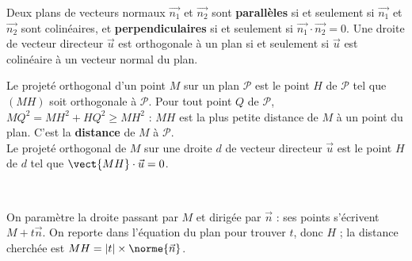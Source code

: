 \begin{propriete}
Deux plans de vecteurs normaux $\vec{n_1}$ et $\vec{n_2}$ sont \textbf{parallèles} si et seulement si $\vec{n_1}$ et $\vec{n_2}$ sont
colinéaires, et \textbf{perpendiculaires} si et seulement si $\vec{n_1}\cdot\vec{n_2}=0$. Une droite de vecteur directeur $\vec u$ est
orthogonale à un plan si et seulement si $\vec u$ est colinéaire à un vecteur normal du plan.
\end{propriete}


\noindent
\begin{minipage}[c]{0.58\linewidth}
\begin{definition}
\raggedright
Le projeté orthogonal d'un point $M$ sur un plan $\mathcal{P}$ est le point $H$ de $\mathcal{P}$ tel que $(MH)$ soit orthogonale à
$\mathcal{P}$. Pour tout point $Q$ de $\mathcal{P}$, $MQ^2=MH^2+HQ^2\geq MH^2$ : $MH$ est la plus petite distance de $M$ à un point
du plan. C'est la \textbf{distance} de $M$ à $\mathcal{P}$.\\[1mm]
Le projeté orthogonal de $M$ sur une droite $d$ de vecteur directeur $\vec u$ est le point $H$ de $d$ tel que $\vect{MH}\cdot\vec u=0$.
\end{definition}
\end{minipage}\hfill
\begin{minipage}[c]{0.38\linewidth}
\centering
{}\\[0.5mm]
\end{minipage}

\begin{savoirfaire}
On paramètre la droite passant par $M$ et dirigée par $\vec n$ : ses points s'écrivent $M+t\vec n$. On reporte dans l'équation du plan
pour trouver $t$, donc $H$ ; la distance cherchée est $MH=|t|\times\norme{\vec n}$.
\end{savoirfaire}

